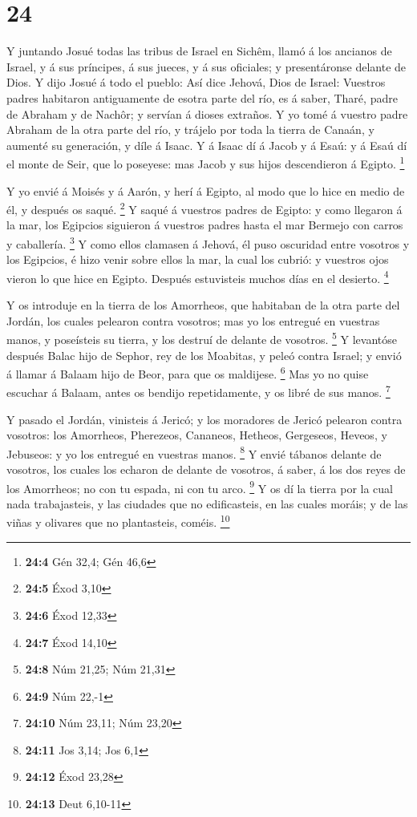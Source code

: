 \hypertarget{section-23}{%
\section{24}\label{section-23}}

 Y juntando Josué todas las tribus de Israel en Sichêm,
llamó á los ancianos de Israel, y á sus príncipes, á sus jueces, y á sus
oficiales; y presentáronse delante de Dios.  Y dijo Josué
á todo el pueblo: Así dice Jehová, Dios de Israel: Vuestros padres
habitaron antiguamente de esotra parte del río, es á saber, Tharé, padre
de Abraham y de Nachôr; y servían á dioses extraños.  Y yo
tomé á vuestro padre Abraham de la otra parte del río, y trájelo por
toda la tierra de Canaán, y aumenté su generación, y díle á Isaac.
 Y á Isaac dí á Jacob y á Esaú: y á Esaú dí el monte de
Seir, que lo poseyese: mas Jacob y sus hijos descendieron á Egipto.
\footnote{\textbf{24:4} Gén 32,4; Gén 46,6}

 Y yo envié á Moisés y á Aarón, y herí á Egipto, al modo
que lo hice en medio de él, y después os saqué. \footnote{\textbf{24:5}
  Éxod 3,10}  Y saqué á vuestros padres de Egipto: y como
llegaron á la mar, los Egipcios siguieron á vuestros padres hasta el mar
Bermejo con carros y caballería. \footnote{\textbf{24:6} Éxod 12,33}
 Y como ellos clamasen á Jehová, él puso oscuridad entre
vosotros y los Egipcios, é hizo venir sobre ellos la mar, la cual los
cubrió: y vuestros ojos vieron lo que hice en Egipto. Después
estuvisteis muchos días en el desierto. \footnote{\textbf{24:7} Éxod
  14,10}

 Y os introduje en la tierra de los Amorrheos, que
habitaban de la otra parte del Jordán, los cuales pelearon contra
vosotros; mas yo los entregué en vuestras manos, y poseísteis su tierra,
y los destruí de delante de vosotros. \footnote{\textbf{24:8} Núm 21,25;
  Núm 21,31}  Y levantóse después Balac hijo de Sephor,
rey de los Moabitas, y peleó contra Israel; y envió á llamar á Balaam
hijo de Beor, para que os maldijese. \footnote{\textbf{24:9} Núm 22,-1}
 Mas yo no quise escuchar á Balaam, antes os bendijo
repetidamente, y os libré de sus manos. \footnote{\textbf{24:10} Núm
  23,11; Núm 23,20}

 Y pasado el Jordán, vinisteis á Jericó; y los moradores
de Jericó pelearon contra vosotros: los Amorrheos, Pherezeos, Cananeos,
Hetheos, Gergeseos, Heveos, y Jebuseos: y yo los entregué en vuestras
manos. \footnote{\textbf{24:11} Jos 3,14; Jos 6,1}  Y
envié tábanos delante de vosotros, los cuales los echaron de delante de
vosotros, á saber, á los dos reyes de los Amorrheos; no con tu espada,
ni con tu arco. \footnote{\textbf{24:12} Éxod 23,28}  Y
os dí la tierra por la cual nada trabajasteis, y las ciudades que no
edificasteis, en las cuales moráis; y de las viñas y olivares que no
plantasteis, coméis. \footnote{\textbf{24:13} Deut 6,10-11}

